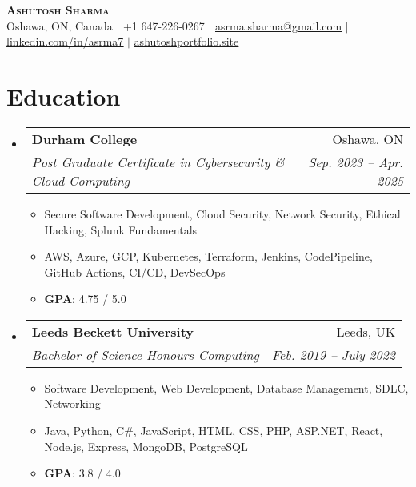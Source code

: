 \documentclass[letterpaper,11pt]{article}
\makeatletter
\newcommand{\resumeItem}[1]{
  \item\small{
    {#1 \vspace{-2pt}}
  }
}
\newcommand{\resumeSubheading}[4]{
  \vspace{-5pt}\item
    \begin{tabular*}{0.97\textwidth}[t]{l@{\extracolsep{\fill}}r}
      \textbf{#1} & #2 \\
      \textit{\small#3} & \textit{\small #4} \\
    \end{tabular*}\vspace{-7pt}
}
\newcommand{\resumeSubHeadingListStart}{\begin{itemize}[leftmargin=0.15in, label={}]}
\newcommand{\resumeSubHeadingListEnd}{\end{itemize}}
\newcommand{\resumeItemListStart}{\begin{itemize}}
\newcommand{\resumeItemListEnd}{\end{itemize}\vspace{-5pt}}
\makeatother
\begin{document}

\begin{center}
    \textbf{\Huge \scshape Ashutosh Sharma} \\ \vspace{1pt}
    {Oshawa, ON, Canada} $|$
    \small +1 647-226-0267 $|$ \href{mailto:asrma.sharma@gmail.com}{\underline{asrma.sharma@gmail.com}} $|$ 
    \href{https://linkedin.com/in/asrma7}{\underline{linkedin.com/in/asrma7}} $|$
    \href{https://ashutoshportfolio.site}{\underline{ashutoshportfolio.site}}
\end{center}


\section{Education}
  \resumeSubHeadingListStart
    \resumeSubheading
      {Durham College}{Oshawa, ON}
      {Post Graduate Certificate in Cybersecurity \& Cloud Computing}{Sep. 2023 -- Apr. 2025}
      \resumeItemListStart
        \resumeItem{Secure Software Development, Cloud Security, Network Security, Ethical Hacking, Splunk Fundamentals}
        \resumeItem{AWS, Azure, GCP, Kubernetes, Terraform, Jenkins, CodePipeline, GitHub Actions, CI/CD, DevSecOps}
        \resumeItem{\textbf{GPA}: 4.75 / 5.0}
      \resumeItemListEnd

    \resumeSubheading
      {Leeds Beckett University}{Leeds, UK}
      {Bachelor of Science Honours Computing}{Feb. 2019 -- July 2022}
        \resumeItemListStart
            \resumeItem{Software Development, Web Development, Database Management, SDLC, Networking}
            \resumeItem{Java, Python, C\#, JavaScript, HTML, CSS, PHP, ASP.NET, React, Node.js, Express, MongoDB, PostgreSQL}
            \resumeItem{\textbf{GPA}: 3.8 / 4.0}
        \resumeItemListEnd
  \resumeSubHeadingListEnd
\end{document}
